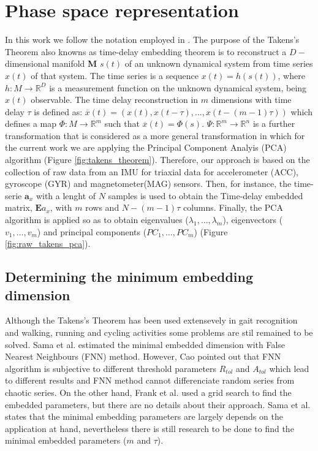 \documentclass{sigchi}
\begin{document}
\section{Phase space representation}
In this work we follow the notation employed in \cite{Uzal2011}.
The purpose of the Takens's Theorem also knowns as time-delay embedding theorem 
is to reconstruct a $D-$dimensional manifold \textbf{M} $s(t)$ of an unknown dynamical 
system from time series $x(t)$ of that system. 
The time series is a sequence $x(t)=h(s(t))$, where $h: M \rightarrow \mathbb{R}^D$
is a measurement function on the unknown dynamical system, being $x(t)$ observable.
The time delay reconstruction in $m$ dimensions with time delay $\tau$ is defined as:
$\overline{x}(t) = (x(t), x(t-\tau),...,x(t-(m-1)\tau))$ which defines a map
$\varPhi: M \rightarrow \mathbb{R}^m$ such that $\overline{x}(t) = \varPhi(s)$.
$\varPsi: \mathbb{R}^m \rightarrow \mathbb{R}^n$ is a further transformation that
is considered as a more general transformation in which for the 
current work we are applying the Principal Component Analyis (PCA) algorithm (Figure \ref{fig:takens_theorem}).
Therefore, our approach is based on the collection 
of raw data from an IMU for triaxial data for accelerometer (ACC), gyroscope (GYR) and magnetometer(MAG) sensors. 
Then, for instance, the time-serie $\textbf{a}_x$ with a lenght of $N$ samples is used to obtain the Time-delay embedded matrix, 
$\boldsymbol{E} a_{x}$, with $m$ rows and $N-(m-1)\tau$ columns. Finally, the PCA algorithm is applied so as to obtain eigenvalues 
($\lambda_1,\ldots,\lambda_m$), eigenvectors ($v_1,\ldots,v_m$) and principal components ($PC_1,\ldots,PC_m$) (Figure \ref{fig:raw_takens_pca}).


\subsection{Determining the minimum embedding dimension}
Although the Takens's Theorem has been used extensevely in gait recognition and walking, running and cycling 
activities some problems are stil remained to be solved.
Sama et al. \cite{Sama2013} estimated the minimal embedded dimension with False Nearest Neighbours (FNN) method.
However, Cao \cite{Cao1997} pointed out that FNN algorithm is subjective to different threshold parameters 
$R_{tol}$ and $A_{tol}$  which lead to different results and FNN method cannot differenciate random series 
from chaotic series. On the other hand, Frank et al. \cite{Frank2010} used a grid search 
to find the embedded parameters, but there are no details about their approach.
Sama et al. \cite{Sama2013} states that the minimal embedding parameters are largely depends on the application at hand, 
nevertheless there is still research to be done to find the minimal embedded parameters ($m$ and $\tau$).
\end{document}
